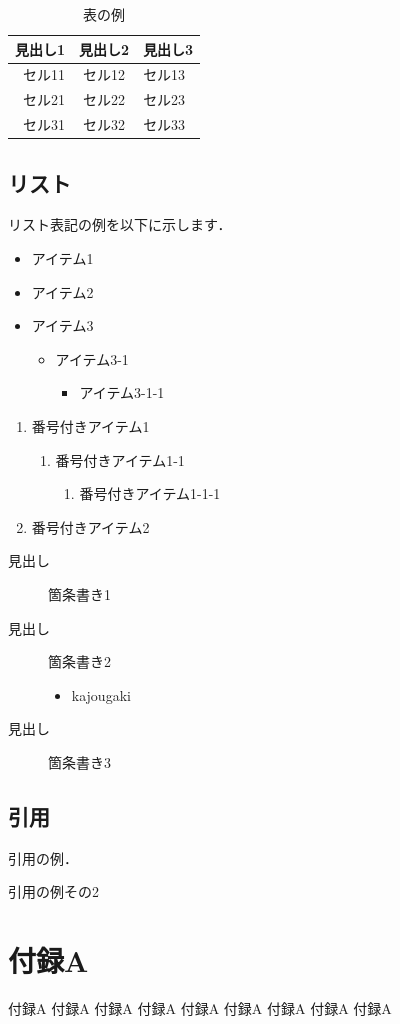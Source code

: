 \documentclass[T]{compsoft}
\begin{document}
\begin{table}[tb]
  \caption{表の例}
  \label{table:tableExample}
  \begin{tabular}{rcl}
  \hline
 見出し1 & 見出し2& 見出し3 \\ \hline
  \hline
  セル11 & セル12 & セル13 \\ \hline
  セル21 & セル22 & セル23 \\ \hline
  セル31 & セル32 & セル33 \\ \hline
  \hline
  \end{tabular}
\end{table}

\newpage

\subsection{リスト}

リスト表記の例を以下に示します．

\begin{itemize}
	\item アイテム1
	\item アイテム2
	\item アイテム3
	\begin{itemize}
		\item アイテム3-1
		\begin{itemize}
			\item アイテム3-1-1
		\end{itemize}
	\end{itemize}
\end{itemize}

\begin{enumerate}
	\item 番号付きアイテム1
	\begin{enumerate}
		\item 番号付きアイテム1-1
		\begin{enumerate}
			\item 番号付きアイテム1-1-1
		\end{enumerate}
	\end{enumerate}
	\item 番号付きアイテム2
\end{enumerate}

\begin{description}
	\item[見出し] 箇条書き1
	\item[見出し] 箇条書き2
		\begin{itemize}
			\item kajougaki
		\end{itemize}
	\item[見出し] 箇条書き3
 \end{description}
\subsection{引用}
引用の例\cite{A02}．

引用の例その2\cite{A02}\cite{A01}




\appendix
\section{付録A} 
付録A
付録A
付録A
付録A
付録A
付録A
付録A
付録A
付録A
\end{document}
